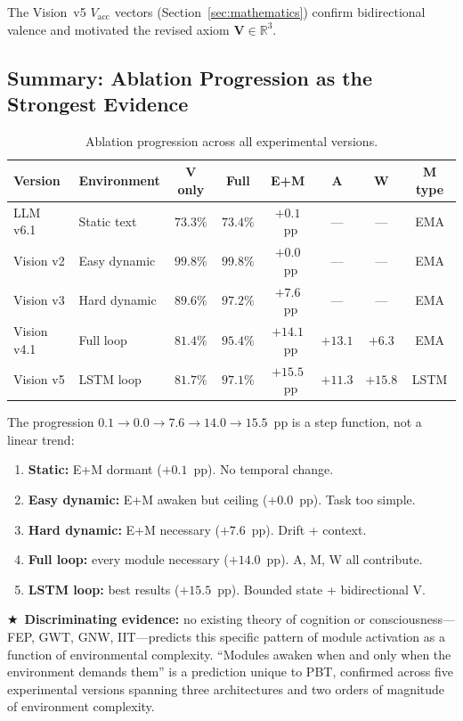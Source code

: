 \documentclass[12pt,a4paper]{article}
\newcommand{\starred}{\textbf{\textcolor{pbtblue}{$\bigstar$}}~}
\begin{document}
The Vision~v5 $V_{\mathrm{acc}}$ vectors (Section~\ref{sec:mathematics})
confirm bidirectional valence and motivated the revised axiom
$\mathbf{V}\in\mathbb{R}^3$.

\subsection{Summary: Ablation Progression as the Strongest Evidence}

\begin{table}[ht]
\centering
\caption{Ablation progression across all experimental versions.}
\label{tab:ablation_full}
\small
\begin{tabular}{@{}llcccccc@{}}
\toprule
\textbf{Version} & \textbf{Environment}
  & \textbf{V only} & \textbf{Full}
  & \textbf{E+M} & \textbf{A} & \textbf{W} & \textbf{M type}\\
\midrule
LLM v6.1    & Static text   & $73.3\%$ & $73.4\%$ & $+0.1$~pp  & ---    & ---    & EMA  \\
Vision v2   & Easy dynamic  & $99.8\%$ & $99.8\%$ & $+0.0$~pp  & ---    & ---    & EMA  \\
Vision v3   & Hard dynamic  & $89.6\%$ & $97.2\%$ & $+7.6$~pp  & ---    & ---    & EMA  \\
Vision v4.1 & Full loop     & $81.4\%$ & $95.4\%$ & $+14.1$~pp & $+13.1$& $+6.3$ & EMA  \\
Vision v5   & LSTM loop     & $81.7\%$ & $97.1\%$ & $+15.5$~pp & $+11.3$& $+15.8$& LSTM \\
\bottomrule
\end{tabular}
\end{table}

The progression $0.1\to 0.0\to 7.6\to 14.0\to 15.5$~pp is a step function,
not a linear trend:
\begin{enumerate}[leftmargin=1.8em]
  \item \textbf{Static:} E+M dormant ($+0.1$~pp). No temporal change.
  \item \textbf{Easy dynamic:} E+M awaken but ceiling ($+0.0$~pp). Task too simple.
  \item \textbf{Hard dynamic:} E+M necessary ($+7.6$~pp). Drift + context.
  \item \textbf{Full loop:} every module necessary ($+14.0$~pp). A, M, W all contribute.
  \item \textbf{LSTM loop:} best results ($+15.5$~pp). Bounded state + bidirectional V.
\end{enumerate}

\starred\textbf{Discriminating evidence:} no existing theory of cognition or
consciousness---FEP, GWT, GNW, IIT---predicts this specific pattern of module
activation as a function of environmental complexity. ``Modules awaken when and
only when the environment demands them'' is a prediction unique to PBT,
confirmed across five experimental versions spanning three architectures and two
orders of magnitude of environment complexity.
\end{document}
